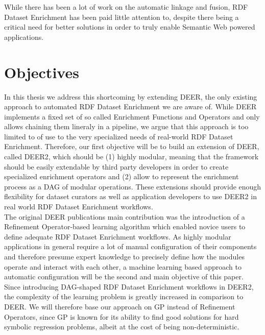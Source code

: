While there has been a lot of work on the automatic linkage and fusion, RDF Dataset Enrichment has been paid little attention to, despite there being a critical need for better solutions in order to truly enable  Semantic Web powered applications.

\section{Objectives}
\label{sec:objectives}
In this thesis we address this shortcoming by extending \ac{DEER}\cite{sherif:2015a}, the only existing approach to automated RDF Dataset Enrichment we are aware of.
While DEER implements a fixed set of so called Enrichment Functions and Operators and only allows chaining them lineraly in a pipeline, we argue that this approach is too limited to of use to the very specialized needs of real-world RDF Dataset Enrichment.
Therefore, our first objective will be to build an extension of \ac{DEER}, called \ac{DEER2}, which should be (1) highly modular, meaning that the framework should be easily extendable by third party developers in order to create specialized enrichment operators and (2) allow to represent the enrichment process as a \ac{DAG} of modular operations.
These extensions should provide enough flexibility for dataset curators as well as application developers to use \ac{DEER2} in real world RDF Dataset Enrichment workflows.\\

The original \ac{DEER} publications main contribution was the introduction of a Refinement Operator-based learning algorithm which enabled novice users to define adequate RDF Dataset Enrichment workflows.
As highly modular applications in general require a lot of manual configuration of their components and therefore presume expert knowledge to precisely define how the modules operate and interact with each other, a machine learning based approach to automatic configuration will be the second and main objective of this paper.\\

Since introducing \ac{DAG}-shaped RDF Dataset Enrichment workflows in \ac{DEER2}, the complexity of the learning problem is greatly increased in comparison to \ac{DEER}.
We will therefore base our approach on \ac{GP} instead of Refinement Operators, since \ac{GP} is known for its ability to find good solutions for hard symbolic regression problems, albeit at the cost of being non-deterministic.

